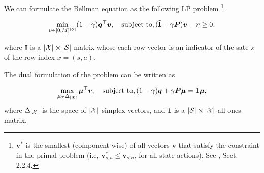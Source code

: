 \documentclass{article}
\DeclarePairedDelimiter\abs{\lvert}{\rvert}%
\newcommand{\ntext}[1]{{\text{\normalfont#1}}}
\newcommand{\R}{\mathbb{R}}
\newcommand{\States}{\mathcal{S}}
\newcommand{\Actions}{\mathcal{A}}
\newcommand{\nSt}{{\abs{\States}}}
\newcommand{\nAct}{{\abs{\Actions}}}
\newcommand{\nPairs}{{\abs{\mathcal{X}}}}
\newcommand{\Pb}{\boldsymbol{P}}
\newcommand{\rb}{\boldsymbol{r}}
\newcommand{\vb}{\boldsymbol{v}}
\newcommand{\mub}{\boldsymbol{\mu}}
\newcommand{\vMax}{M}
\newcommand{\onesVec}{\mathbf{1}}
\newcommand{\Ibt}{\tilde{\textbf{I}}}
\newcommand{\Ib}{\boldsymbol{I}}
\newcommand{\initDist}{\boldsymbol{q}}
\newcommand{\vecop}{\ntext{vec}}
\begin{document}
We can formulate the Bellman equation as the following LP problem
\footnote{$\vb^*$ is the smallest (component-wise) of all vectors $\vb$ that satisfy the constraint in the primal problem (i.e, $\vb^*_{s,a} \leq \vb_{s,a}$, for all state-actions). See \citet{bertsekas1996neuro}, Sect. 2.2.4.}

\begin{equation} \label{eq:Primal}
    \min_{\vb \in [0,\vMax]^{\nSt}} (1-\gamma) \initDist^\top  \vb, \quad \ntext{subject to}, (\Ibt - \gamma \Pb)  \vb - \rb \geq 0,
\end{equation}

where $\Ibt$ is a $\nPairs \times \nSt$ matrix whose  each row vector is an indicator of the sate $s$ of the row index $x=(s,a)$.


The dual formulation of the problem can be written as 

  \begin{equation} \label{eq:Dual_comp}
    \max_{\mub \in \Delta_{\nPairs}}  \mub^\top \rb, \quad \ntext{subject to},  (1-\gamma) \initDist + \gamma  \Pb \mub = \onesVec \mub,
\end{equation}
where $\Delta_{\nPairs}$ is the space of $\nPairs$-simplex vectors, and $\onesVec$ is a $\nSt \times \nPairs$ all-ones matrix. 




\end{document}

